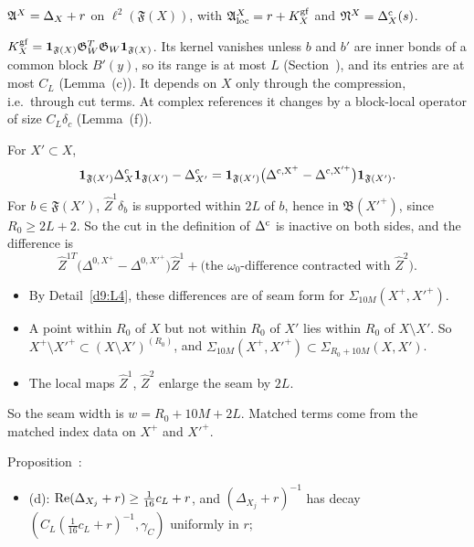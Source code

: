 \begin{detail}\label{d9:L5}
$\mathfrak A^X=\Delta_X+r$ on $\ell^2(\mathfrak F(X))$, with $\mathfrak A^X_{\rm loc}=r+K^{\rm gf}_X$ and $\mathfrak N^X=\Delta^{\rm c}_X(s)$.
\begin{step}[(W1)]
$K^{\rm gf}_X=\mathbf 1_{\mathfrak F(X)}\mathfrak G_W^T\mathfrak G_W\mathbf 1_{\mathfrak F(X)}$. Its kernel vanishes unless $b$ and $b'$ are inner bonds of a common block $B'(y)$, so its range is at most $L$ (Section~), and its entries are at most $C_L$ (Lemma~(c)). It depends on $X$ only through the compression, i.e.\ through cut terms. At complex references it changes by a block-local operator of size $C_L\delta_c$ (Lemma~(f)).
\end{step}
\begin{step}
For $X'\subset X$,
\[
\mathbf 1_{\mathfrak F(X')}\Delta^{\rm c}_X\mathbf 1_{\mathfrak F(X')}-\Delta^{\rm c}_{X'}=\mathbf 1_{\mathfrak F(X')}\big(\Delta^{\rm c,X^+}-\Delta^{\rm c,X'^+}\big)\mathbf 1_{\mathfrak F(X')} .
\]
For $b\in\mathfrak F(X')$, $\hat Z^1\delta_b$ is supported within $2L$ of $b$, hence in $\mathfrak B(X'^+)$, since $R_0\ge2L+2$. So the cut in the definition of $\Delta^{\rm c}$ is inactive on both sides, and the difference is
\[
\hat Z^{1T}\big(\Delta^{0,X^+}-\Delta^{0,X'^+}\big)\hat Z^1+\text{(the $\omega_0$-difference contracted with $\hat Z^2$)} .
\]
\begin{itemize}
\item By Detail~\ref{d9:L4}, these differences are of seam form for $\Sigma_{10M}(X^+,X'^+)$.
\item A point within $R_0$ of $X$ but not within $R_0$ of $X'$ lies within $R_0$ of $X\setminus X'$. So $X^+\setminus X'^+\subset(X\setminus X')^{(R_0)}$, and $\Sigma_{10M}(X^+,X'^+)\subset\Sigma_{R_0+10M}(X,X')$.
\item The local maps $\hat Z^1$, $\hat Z^2$ enlarge the seam by $2L$.
\end{itemize}
So the seam width is $w=R_0+10M+2L$. Matched terms come from the matched index data on $X^+$ and $X'^+$.
\end{step}
\begin{step}[(W2)]
Proposition~:
\begin{itemize}
\item (d): $\operatorname{Re}(\Delta_{X_j}+r)\ge\frac1{16}c_L+r$, and $(\Delta_{X_j}+r)^{-1}$ has decay $(C_L(\frac1{16}c_L+r)^{-1},\gamma_C)$ uniformly in $r$;

\end{itemize}
\end{step}
\end{detail}
